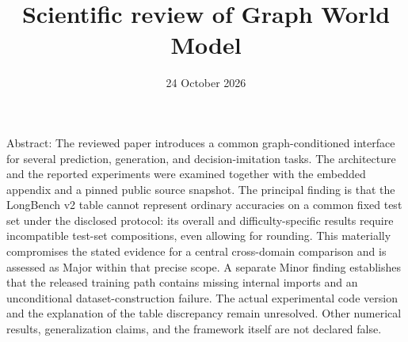\documentclass[10pt]{article}
\title{Scientific review of Graph World Model}
\author{}
\date{24 October 2026}
\begin{document}
\maketitle
Abstract: The reviewed paper introduces a common graph-conditioned interface for several prediction, generation, and decision-imitation tasks. The architecture and the reported experiments were examined together with the embedded appendix and a pinned public source snapshot. The principal finding is that the LongBench v2 table cannot represent ordinary accuracies on a common fixed test set under the disclosed protocol: its overall and difficulty-specific results require incompatible test-set compositions, even allowing for rounding. This materially compromises the stated evidence for a central cross-domain comparison and is assessed as Major within that precise scope. A separate Minor finding establishes that the released training path contains missing internal imports and an unconditional dataset-construction failure. The actual experimental code version and the explanation of the table discrepancy remain unresolved. Other numerical results, generalization claims, and the framework itself are not declared false.\par
\end{document}
